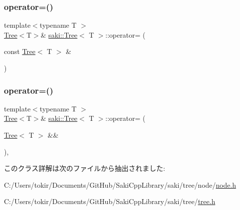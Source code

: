 \subsubsection{\texorpdfstring{operator=()}{operator=()}\hspace{0.1cm}{\footnotesize\ttfamily [1/2]}}
{\footnotesize\ttfamily template$<$typename T $>$ \\
\mbox{\hyperlink{classsaki_1_1_tree}{Tree}}$<$T$>$\& \mbox{\hyperlink{classsaki_1_1_tree}{saki\+::\+Tree}}$<$ T $>$\+::operator= (\begin{DoxyParamCaption}\item[{const \mbox{\hyperlink{classsaki_1_1_tree}{Tree}}$<$ T $>$ \&}]{ }\end{DoxyParamCaption})\hspace{0.3cm}{\ttfamily [default]}}

\mbox{\label{classsaki_1_1_tree_a71749080c165c790b38596e5c0c151df}} 
\subsubsection{\texorpdfstring{operator=()}{operator=()}\hspace{0.1cm}{\footnotesize\ttfamily [2/2]}}
{\footnotesize\ttfamily template$<$typename T $>$ \\
\mbox{\hyperlink{classsaki_1_1_tree}{Tree}}$<$T$>$\& \mbox{\hyperlink{classsaki_1_1_tree}{saki\+::\+Tree}}$<$ T $>$\+::operator= (\begin{DoxyParamCaption}\item[{\mbox{\hyperlink{classsaki_1_1_tree}{Tree}}$<$ T $>$ \&\&}]{ }\end{DoxyParamCaption})\hspace{0.3cm}{\ttfamily [default]}, {\ttfamily [noexcept]}}



このクラス詳解は次のファイルから抽出されました\+:\begin{DoxyCompactItemize}
\item 
C\+:/\+Users/tokir/\+Documents/\+Git\+Hub/\+Saki\+Cpp\+Library/saki/tree/node/\mbox{\hyperlink{node_8h}{node.\+h}}\item 
C\+:/\+Users/tokir/\+Documents/\+Git\+Hub/\+Saki\+Cpp\+Library/saki/tree/\mbox{\hyperlink{tree_8h}{tree.\+h}}\end{DoxyCompactItemize}
